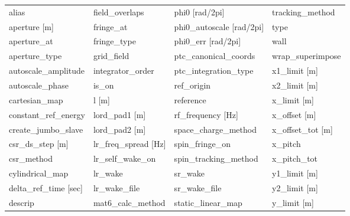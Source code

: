  \begin{tabular}{llll} \toprule
alias                            & field_overlaps                   & phi0 [rad/2pi]                   & tracking_method                  \\
aperture [m]                     & fringe_at                        & phi0_autoscale [rad/2pi]         & type                             \\
aperture_at                      & fringe_type                      & phi0_err [rad/2pi]               & wall                             \\
aperture_type                    & grid_field                       & ptc_canonical_coords             & wrap_superimpose                 \\
autoscale_amplitude              & integrator_order                 & ptc_integration_type             & x1_limit [m]                     \\
autoscale_phase                  & is_on                            & ref_origin                       & x2_limit [m]                     \\
cartesian_map                    & l [m]                            & reference                        & x_limit [m]                      \\
constant_ref_energy              & lord_pad1 [m]                    & rf_frequency [Hz]                & x_offset [m]                     \\
create_jumbo_slave               & lord_pad2 [m]                    & space_charge_method              & x_offset_tot [m]                 \\
csr_ds_step [m]                  & lr_freq_spread [Hz]              & spin_fringe_on                   & x_pitch                          \\
csr_method                       & lr_self_wake_on                  & spin_tracking_method             & x_pitch_tot                      \\
cylindrical_map                  & lr_wake                          & sr_wake                          & y1_limit [m]                     \\
delta_ref_time [sec]             & lr_wake_file                     & sr_wake_file                     & y2_limit [m]                     \\
descrip                          & mat6_calc_method                 & static_linear_map                & y_limit [m]                      \\

\end{tabular}
